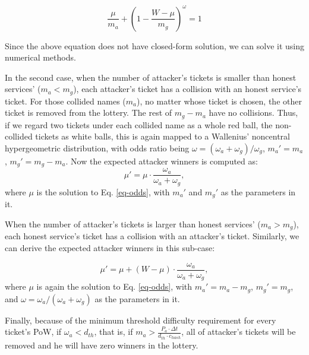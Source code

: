\documentclass[USenglish,oneside,twocolumn]{article}
\begin{document}
\begin{equation}
\frac{\mu}{m_a}+(1-\frac{W-\mu}{m_g})^\omega = 1 \label{eq-odds}
\end{equation}

Since the above equation does not have closed-form solution, we can solve it using numerical methods. 

In the second case, when the number of attacker's tickets  is smaller than honest services' ($m_a<m_g$),  each attacker's ticket has a collision with an honest service's ticket. For those collided names ($m_a$), no matter whose ticket is chosen, the other ticket is removed from the lottery. The rest of $m_g-m_a$ have no collisions. Thus, if we regard two  tickets under each collided name as a whole red ball, the non-collided tickets as white balls, this is again mapped to a Wallenius' noncentral hypergeometric distribution, with odds ratio being $\omega = (\omega_a+\omega_g) / \omega_g$, $m_a'=m_a$, $m_g'=m_g-m_a$.  Now the expected attacker winners is computed as: 
\begin{equation}
\mu'=\mu\cdot \frac{\omega_a}{ \omega_a+\omega_g},
\end{equation}
where $\mu$ is the solution to Eq. \ref{eq-odds}, with $m_a'$ and $m_g'$ as the parameters in it.

When the number of attacker's tickets is larger than honest services' ($m_a>m_g$), each honest service's ticket has a collision with an attacker's ticket. Similarly, we can derive the expected attacker winners in this sub-case:

\begin{equation}
\mu'=\mu+(W-\mu)\cdot \frac{\omega_a}{ \omega_a+\omega_g},
\end{equation}
where $\mu$ is again the solution to Eq. \ref{eq-odds}, with $m_a'=m_a-m_g$,  $m_g'=m_g$, and $\omega = \omega_a / (\omega_a+\omega_g)$ as the parameters in it. 

Finally, because of the minimum threshold difficulty requirement for every ticket's PoW, if $\omega_a<d_{\mathit{th}}$, that is, if $m_a>\frac{P_a\cdot \Delta t}{d_{\mathit{th}}\cdot c_{\mathit{hash}}}$, all of attacker's tickets will be removed and he will have zero winners in the lottery. 
\end{document}
